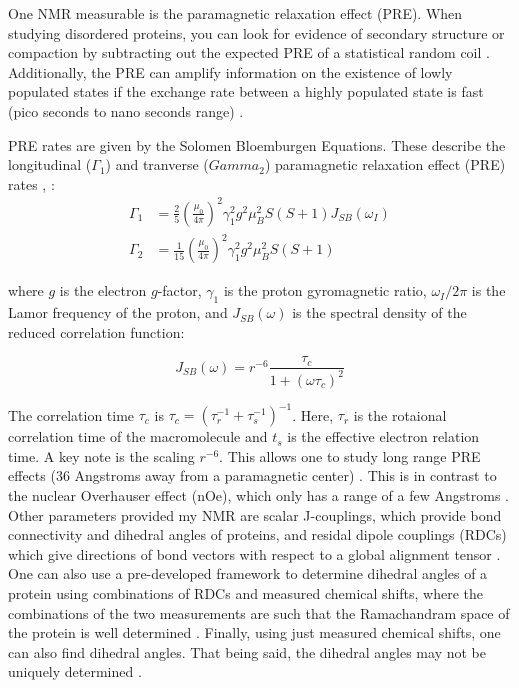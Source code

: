 \documentclass{article}
\begin{document}
One NMR measurable is the paramagnetic relaxation effect (PRE). When studying disordered proteins, you can look for evidence of secondary structure or compaction by subtracting out the expected PRE of a statistical random coil \cite{cloreTheoryPracticeApplications2009}. Additionally, the PRE can amplify information on the existence of lowly populated states if the exchange rate between a highly populated state is fast (pico seconds to nano seconds range) \cite{cloreTheoryPracticeApplications2009}.

PRE rates are given by the Solomen Bloemburgen Equations. 
These describe the longitudinal ($\Gamma_1$) and tranverse ($Gamma_2$) paramagnetic relaxation effect (PRE) rates \cite{bloembergenProtonRelaxationTimes1961},\cite{solomonRelaxationProcessesSystem1955}
: 
\begin{align}
\Gamma_1 &= \frac{2}{5} \left( \frac{\mu_0}{4\pi} \right)^2 \gamma_1^2 g^2 \mu_B^2 S(S+1)J_{SB}(\omega_I)\\
\Gamma_2 &= \frac{1}{15} \left( \frac{\mu_0}{4\pi} \right)^2 \gamma_1^2 g^2 \mu_B^2 S(S+1)
\end{align}


where $g$ is the electron $g$-factor, $\gamma_1$ is the proton gyromagnetic ratio, $\omega_I/2\pi$ is the Lamor frequency of the proton, and $J_{SB}(\omega)$ is the spectral density of the reduced correlation function:

\begin{equation}
J_{SB}(\omega) = r^{-6} \frac{\tau_c}{1+ \left( \omega \tau_c \right)^2}
\end{equation}

The correlation time $\tau_c$ is $\tau_c = \left (\tau_r^{-1} + \tau_s^{-1}\right)^{-1}$.
Here, $\tau_r$ is the rotaional correlation time of the macromolecule and $t_s$ is the effective electron relation time. 
A key note is the scaling $r^{-6}$.
This allows one to study long range PRE effects (36 Angstroms away from a paramagnetic center) \cite{cloreTheoryPracticeApplications2009}.
This is in contrast to the nuclear Overhauser effect (nOe), which only has a range of a few Angstroms \cite{cloreTheoryPracticeApplications2009}.
Other parameters provided my NMR are scalar J-couplings, which provide bond connectivity and dihedral angles of proteins, and residal dipole couplings (RDCs) which give directions of bond vectors with respect to a global alignment tensor \cite{marionIntroductionBiologicalNMR2013}. One can also use a pre-developed framework to determine dihedral angles of a protein using combinations of RDCs and measured chemical shifts, where the combinations of the two measurements are such that the Ramachandram space of the protein is well determined \cite{ozenneMappingPotentialEnergy2012}. Finally, using just measured chemical shifts, one can also find dihedral angles. That being said, the dihedral angles may not be uniquely determined \cite{krageljConformationalPropensitiesIntrinsically2013}. 
\end{document}
